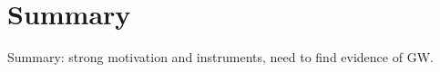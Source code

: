     \section{Summary}
    \label{intro_summary}
 
        Summary: strong motivation and instruments, need to find evidence of GW.    
            
%

%
%
%
  

